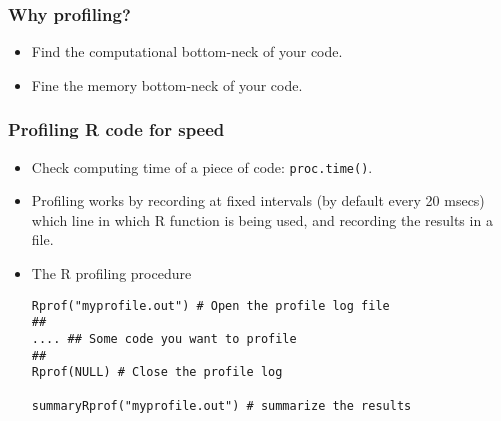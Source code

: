 \documentclass[10pt]{beamer}
\begin{document}
\begin{frame}
  \frametitle{Why profiling?}

  \begin{itemize}
  \item Find the computational bottom-neck of your code.
  \item Fine the memory bottom-neck of your code.
  \end{itemize}

\end{frame}


\begin{frame}[fragile]
  \frametitle{Profiling R code for speed}

  \begin{itemize}
  \item Check computing time of a piece of code: \texttt{proc.time()}.
  \item Profiling works by recording at fixed intervals (by default
    every 20 msecs) which line in which R function is being used, and
    recording the results in a file.
  \item The R profiling procedure

\begin{verbatim}
Rprof("myprofile.out") # Open the profile log file
##
.... ## Some code you want to profile
##
Rprof(NULL) # Close the profile log

summaryRprof("myprofile.out") # summarize the results

\end{verbatim}
  \end{itemize}

\end{frame}
\end{document}

